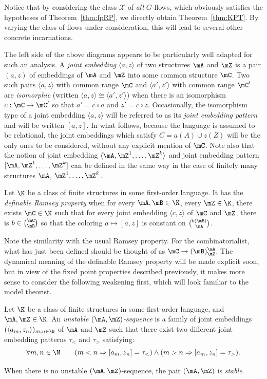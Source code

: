 Notice that by considering the class $\mathcal X$ of \emph{all} $G$-flows, which obviously satisfies the hypotheses of Theorem~\ref{thm:fpRP}, we directly obtain Theorem~\ref{thm:KPT}. By varying the class of flows under consideration, this will lead to several other concrete incarnations.

The left side of the above diagrams appears to be particularly well adapted for such an analysis. A \emph{joint embedding} $\langle a,z\rangle$ of two structures $\mA$ and $\mZ$ is a pair $(a,z)$ of embeddings of $\mA$ and $\mZ$ into some common structure $\mC$. Two such pairs $\langle a,z\rangle$ with common range $\mC$ and $\langle a',z'\rangle$ with common range $\mC'$ are \emph{isomorphic} (written $\langle a,z\rangle \cong \langle a',z'\rangle$) when there is an isomorphism $c:\mC\rightarrow \mC'$ so that $a'=c\circ a$ and $z'=c\circ z$. Occasionally, the isomorphism type of a joint embedding $\langle a,z\rangle$ will be referred to as its \emph{joint embedding pattern} and will be written $[a,z]$. In what follows, because the language is assumed to be relational, the joint embeddings which satisfy $C=a(A)\cup z(Z)$ will be the only ones to be considered, without any explicit mention of $\mC$. Note also that the notion of joint embedding $\langle \mA, \mZ^{1},\ldots,\mZ^{k}\rangle$ and joint embedding pattern $[\mA, \mZ^{1},\ldots,\mZ^{k}]$ can be defined in the same way in the case of finitely many structures $\mA$, $\mZ^{1},\ldots,\mZ^{k}$.

\begin{defi}
Let $\K$ be a class of finite structures in some first-order language. It has the \emph{definable Ramsey property} when for every $\mA, \mB\in \K$, every $\mZ\in \K$, there exists $\mC \in \K$ such that for every joint embedding $\langle c,z\rangle$ of $\mC$ and $\mZ$, there is $b\in \binom{\mC}{\mB}$ so that the coloring $a\mapsto [a,z]$ is constant on $\binom{b(\mB)}{\mA}$.
\end{defi}

Note the similarity with the usual Ramsey property. For the combinatorialist, what has just been defined should be thought of as $\mC \rightarrow (\mB)^{\mA}_{\mZ}$. The dynamical meaning of the definable Ramsey property will be made explicit soon, but in view of the fixed point properties described previously, it makes more sense to consider the following weakening first, which will look familiar to the model theorist.

\begin{defi}
Let $\K$ be a class of finite structures in some first-order language, and $\mA, \mZ\in \K$. An \emph{unstable $(\mA,\mZ)$-sequence} is a family of joint embeddings $(\langle a_{m}, z_{n}\rangle)_{m, n\in\N}$ of $\mA$ and $\mZ$ such that there exist two different joint embedding patterns $\tau_{<}$ and $\tau_{>}$ satisfying:
\[
\forall m,n\in \N \qquad (m<n \Rightarrow [a_{m},z_{n}] = \tau_{<})\wedge (m>n \Rightarrow [a_{m},z_{n}] = \tau_{>}).
\]

When there is no unstable $(\mA, \mZ)$-sequence, the pair $(\mA, \mZ)$ is \emph{stable}.
\end{defi}

